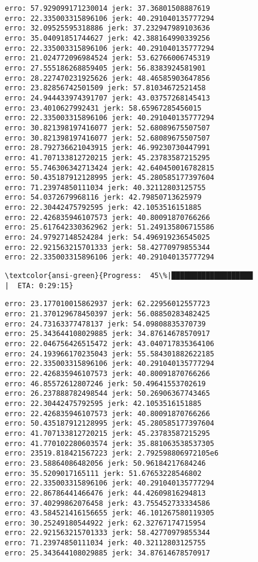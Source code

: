 \documentclass[11pt]{article}
\begin{document}
    \begin{Verbatim}[commandchars=\\\{\}]
erro: 57.929099171230014 jerk: 37.36801508887619
erro: 22.335003315896106 jerk: 40.291040135777294
erro: 32.09525595318886 jerk: 37.232947989103636
erro: 35.04091851744627 jerk: 42.388164990339256
erro: 22.335003315896106 jerk: 40.291040135777294
erro: 21.024772096984524 jerk: 53.62766006745319
erro: 27.555186268859405 jerk: 56.8383924581901
erro: 28.227470231925626 jerk: 48.46585903647856
erro: 23.82856742501509 jerk: 57.81034672521458
erro: 24.944433974391707 jerk: 43.03757268145413
erro: 23.4010627992431 jerk: 58.65967285456015
erro: 22.335003315896106 jerk: 40.291040135777294
erro: 30.821398197416077 jerk: 52.68089675507507
erro: 30.821398197416077 jerk: 52.68089675507507
erro: 28.792736621043915 jerk: 46.99230730447991
erro: 41.707133812720215 jerk: 45.23783587215295
erro: 55.746306342713424 jerk: 42.640450016782815
erro: 50.435187912128995 jerk: 45.280585177397604
erro: 71.23974850111034 jerk: 40.32112803125755
erro: 54.0372679968116 jerk: 42.79850713625979
erro: 22.30442475792595 jerk: 42.1053516151885
erro: 22.426835946107573 jerk: 40.80091870766266
erro: 25.617642330362962 jerk: 51.249135806715586
erro: 24.97927148524284 jerk: 54.496919236545025
erro: 22.921563215701333 jerk: 58.42770979855344
erro: 22.335003315896106 jerk: 40.291040135777294

    \end{Verbatim}

    \begin{Verbatim}[commandchars=\\\{\}]
\textcolor{ansi-green}{Progress:  45\%|███████████████████                      |  ETA: 0:29:15}
    \end{Verbatim}

    \begin{Verbatim}[commandchars=\\\{\}]
erro: 23.177010015862937 jerk: 62.22956012557723
erro: 21.370129678450397 jerk: 56.08850283482425
erro: 24.73163377478137 jerk: 54.09808835370739
erro: 25.343644108029885 jerk: 34.87614678570917
erro: 22.046756426515472 jerk: 43.040717835364106
erro: 24.193966170235043 jerk: 55.584301882622185
erro: 22.335003315896106 jerk: 40.291040135777294
erro: 22.426835946107573 jerk: 40.80091870766266
erro: 46.85572612807246 jerk: 50.49641553702619
erro: 26.237888782498544 jerk: 50.26906367743465
erro: 22.30442475792595 jerk: 42.1053516151885
erro: 22.426835946107573 jerk: 40.80091870766266
erro: 50.435187912128995 jerk: 45.280585177397604
erro: 41.707133812720215 jerk: 45.23783587215295
erro: 41.770102280603574 jerk: 35.881063538537305
erro: 23519.818421567223 jerk: 2.792598806972105e6
erro: 23.58864086482056 jerk: 50.96184217684246
erro: 35.5209017165111 jerk: 51.67653228546802
erro: 22.335003315896106 jerk: 40.291040135777294
erro: 22.86786441466476 jerk: 44.42609816294813
erro: 37.40299862076458 jerk: 43.755452733334586
erro: 43.584521416156655 jerk: 46.101267580119305
erro: 30.25249180544922 jerk: 62.32767174715954
erro: 22.921563215701333 jerk: 58.42770979855344
erro: 71.23974850111034 jerk: 40.32112803125755
erro: 25.343644108029885 jerk: 34.87614678570917

    \end{Verbatim}
\end{document}
